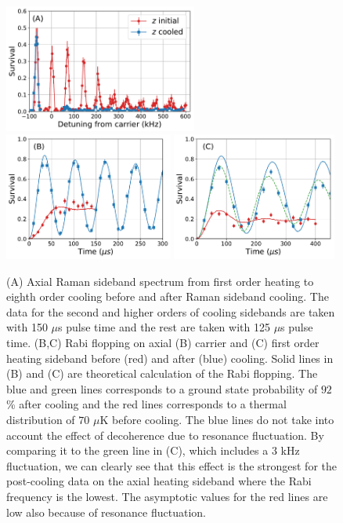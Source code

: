 \documentclass[aps,prl,twocolumn,groupedaddress]{revtex4-1}
\begin{document}
\begin{figure}
  \includegraphics[height=4.2cm]{imgs/spectrum_a1.pdf}
  \includegraphics[height=4.2cm]{imgs/rabi_flop_a1_0.pdf}
  \includegraphics[height=4.2cm]{imgs/rabi_flop_a1_p1.pdf}
  \caption{(A) Axial Raman sideband spectrum from first order heating to eighth order cooling
    before and after Raman sideband cooling.
    The data for the second and higher orders of cooling sidebands are taken with 150 $\mu$s
    pulse time and the rest are taken with 125 $\mu$s pulse time.
    (B,C) Rabi flopping on axial (B) carrier and (C) first order heating sideband
    before (red) and after (blue) cooling.
    Solid lines in (B) and (C) are theoretical calculation of the Rabi flopping.
    The blue and green lines corresponds to a ground state probability of $92$\% after cooling and
    the red lines corresponds to a thermal distribution of $70$ $\mu$K before cooling.
    The blue lines do not take into account the effect of decoherence due to resonance
    fluctuation. By comparing it to the green line in (C), which includes a $3$ kHz fluctuation,
    we can clearly see that this effect is the strongest for the post-cooling data on
    the axial heating sideband where the Rabi frequency is the lowest.
    The asymptotic values for the red lines are low also because of resonance fluctuation.
    \label{f-axial}}
\end{figure}
\end{document}
